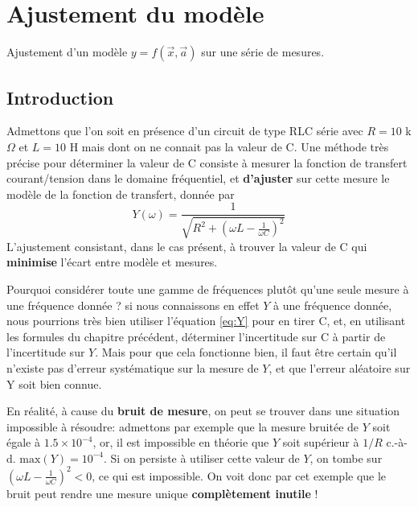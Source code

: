 \documentclass[main.tex]{subfiles}
\begin{document}
\iftrue
\newpage
\section{Ajustement du modèle}
\label{chap:model-adjustment}

Ajustement d'un modèle $y=f(\vec{x},\vec{a})$ sur une série de mesures.

\subsection{Introduction}

Admettons que l'on soit en présence d'un circuit de type RLC série avec $R=10$ k$\Omega$ et $L=10$ H mais dont on ne connait pas la valeur de C. Une méthode très précise pour déterminer la valeur de C consiste à mesurer la fonction de transfert courant/tension dans le domaine fréquentiel, et \textbf{d'ajuster} sur cette mesure le modèle de la fonction de transfert, donnée par
\begin{equation}
    Y(\omega)=\frac{1}{\sqrt{R^2+\left(\omega L-\frac{1}{\omega C}\right)^2}}
    \label{eq:Y}
\end{equation}
L'ajustement consistant, dans le cas présent, à trouver la valeur de C qui \textbf{minimise} l'écart entre modèle et mesures.

Pourquoi considérer toute une gamme de fréquences plutôt qu'une seule mesure à une fréquence donnée ? si nous connaissons en effet $Y$ à une fréquence donnée, nous pourrions très bien utiliser l'équation \ref{eq:Y} pour en tirer C, et, en utilisant les formules du chapitre précédent, déterminer l'incertitude sur C à partir de l'incertitude sur $Y$. Mais pour que cela fonctionne bien, il faut être certain qu'il n'existe pas d'erreur systématique sur la mesure de $Y$, et que l'erreur aléatoire sur Y soit bien connue.

En réalité, à cause du \textbf{bruit de mesure}, on peut se trouver dans une situation impossible à résoudre: admettons par exemple que la mesure bruitée de $Y$ soit égale à $1.5\times10^{-4}$, or, il est impossible en théorie que $Y$ soit supérieur à $1/R$ c.-à-d. $\text{max}(Y)=10^{-4}$. Si on persiste à utiliser cette valeur de $Y$, on tombe sur $\left(\omega L-\frac{1}{\omega C}\right)^2<0$, ce qui est impossible. On voit donc par cet exemple que le bruit peut rendre une mesure unique \textbf{complètement inutile} !
\end{document}
